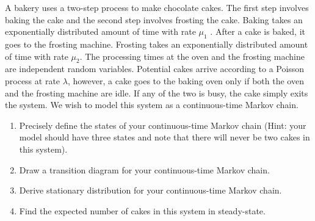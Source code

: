 \begin{problem}
A bakery uses a two-step process to make chocolate cakes. The first step involves baking the cake and the second step involves frosting the cake. Baking takes an exponentially distributed amount of time with rate \( \mu_1 \) . After a cake is baked, it goes to the frosting machine. Frosting takes an exponentially distributed amount of time with rate \( \mu_2 \). The processing times at the oven and the frosting machine are independent random variables. Potential cakes arrive according to a Poisson process at rate \( \lambda \), however, a cake goes to the baking oven only if both the oven and the frosting machine are idle. If any of the two is busy, the cake simply exits the system. We wish to model this system as a continuous-time Markov chain.
\begin{enumerate}[nolistsep,label=(\alph*)]
    \item Precisely define the states of your continuous-time Markov chain (Hint: your model should have three states and note that there will never be two cakes in this system).
    \item Draw a transition diagram for your continuous-time Markov chain.
    \item Derive stationary distribution for your continuous-time Markov chain.
    \item Find the expected number of cakes in this system in steady-state.
\end{enumerate}
\end{problem}

